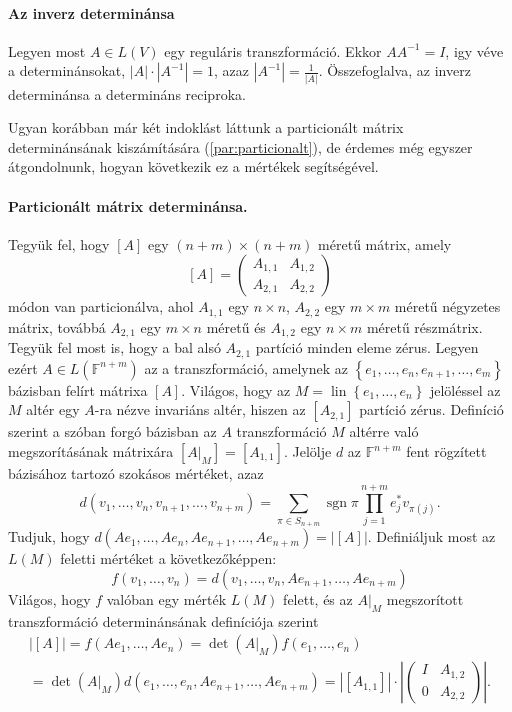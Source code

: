 \documentclass[9pt, a4paper, showtrims]{memoir}
\theoremstyle{plain}
\theoremstyle{remark}
\theoremstyle{definition}
\DeclareMathOperator{\sgn}{sgn}
\DeclareMathOperator{\lin}{lin}
\begin{document}
\paragraph{Az inverz determinánsa}
Legyen most $A\in L\left( V \right)$ egy reguláris transzformáció.
Ekkor $AA^{-1}=I$, igy véve a determinánsokat, $|A|\cdot|A^{-1}|=1$, azaz
$|A^{-1}|=\frac{1}{|A|}$.
Összefoglalva, az inverz determinánsa a determináns reciproka.

Ugyan korábban már két indoklást láttunk a particionált mátrix determinánsának kiszámítására (\ref{par:particionalt}), 
de érdemes még egyszer átgondolnunk, hogyan következik ez a mértékek segítségével.
\paragraph{Particionált mátrix determinánsa.}\label{par:particionalt2}
Tegyük fel, hogy $[A]$ egy $(n+m)\times(n+m)$ méretű mátrix,
amely
\[
    [A]
	=
	\begin{pmatrix}
		A_{1,1} & A_{1,2} \\
		A_{2,1} & A_{2,2}
	\end{pmatrix}
\]
módon van particionálva, ahol $A_{1,1}$ egy $n\times n$, $A_{2,2}$ egy $m\times m$ méretű négyzetes mátrix,
továbbá $A_{2,1}$ egy $m\times n$ méretű és $A_{1,2}$ egy $n\times m$ méretű részmátrix.
Tegyük fel most is, hogy a bal alsó $A_{2,1}$ partíció minden eleme zérus.
Legyen ezért $A\in L\left( \mathbb{F}^{n+m} \right)$ az a transzformáció,
amelynek az $\left\{ e_1,\ldots,e_n,e_{n+1},\ldots,e_m \right\}$ bázisban felírt mátrixa $[A]$.
Világos, hogy az $M=\lin\left\{ e_1,\ldots,e_n \right\}$ jelöléssel az $M$ altér egy $A$-ra nézve invariáns altér, hiszen az $[A_{2,1}]$ partíció zérus.
Definíció szerint a szóban forgó bázisban az $A$ transzformáció $M$ altérre való megszorításának mátrixára $[A|_M]=[A_{1,1}]$.
Jelölje $d$ az $\mathbb{F}^{n+m}$ fent rögzített bázisához tartozó szokásos mértéket, azaz
\[
    d\left( v_1,\ldots,v_n,v_{n+1},\ldots,v_{n+m} \right)
    =
    \sum_{\pi\in S_{n+m}}\sgn \pi\prod_{j=1}^{n+m}e_j^\ast v_{\pi\left( j \right)}.
\]
Tudjuk, hogy $d\left( Ae_1,\ldots,Ae_{n},Ae_{n+1},\ldots,Ae_{n+m} \right)=|[A]|$.
Definiáljuk most az $L\left( M \right)$ feletti mértéket a következőképpen:
\[
    f\left( v_1,\ldots,v_{n} \right)
    =
    d\left( v_1,\ldots,v_n, Ae_{n+1},\ldots,Ae_{n+m} \right)
\]
Világos, hogy $f$ valóban egy mérték $L\left( M \right)$ felett,
és az $A|_M$ megszorított transzformáció determinánsának definíciója szerint
\begin{multline*}
    |[A]|=
    f\left( Ae_1,\ldots,Ae_n \right)
    =
    \det\left( A|_M \right)f\left( e_1,\ldots,e_n \right)
    \\
    =
    \det\left( A|_M \right)d\left( e_1,\ldots,e_n,Ae_{n+1},\ldots,Ae_{n+m} \right)
    =
    |[A_{1,1}]|\cdot
    \left|
    \begin{pmatrix}
        I&A_{1,2}\\0&A_{2,2}
    \end{pmatrix}
    \right|.
\end{multline*}
\end{document}
